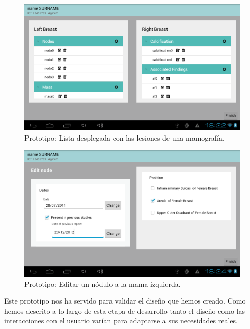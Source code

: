 \begin{figure}[ht]
\centering
\includegraphics[scale=0.4]{./imgs/prototipo/open-tree.png}
\caption{Prototipo: Lista desplegada con las lesiones de una mamografía.}
\label{fig:prototipo:treenodes}
\end{figure}


\begin{figure}[ht]
    \centering
    \includegraphics[scale=0.4]{./imgs/prototipo/editnode.png}
    \caption{Prototipo: Editar un nódulo a la mama izquierda.}
    \label{fig:prototipo:edit}
\end{figure}

Este prototipo nos ha servido para validar el diseño que hemos creado. Como hemos descrito a lo largo de esta etapa de desarrollo tanto el diseño como las interacciones con el usuario varían para adaptarse a sus necesidades reales.\par 




